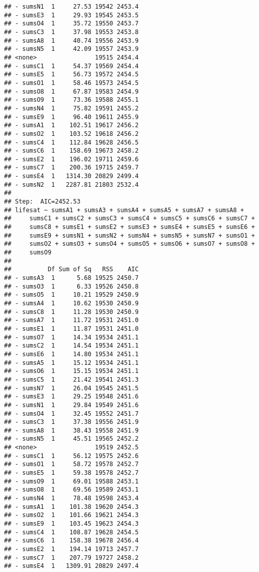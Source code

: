 \documentclass[,man,floatsintext]{apa6}
\begin{document}
\begin{verbatim}
## - sumsN1  1     27.53 19542 2453.4
## - sumsE3  1     29.93 19545 2453.5
## - sumsO4  1     35.72 19550 2453.7
## - sumsC3  1     37.98 19553 2453.8
## - sumsA8  1     40.74 19556 2453.9
## - sumsN5  1     42.09 19557 2453.9
## <none>                19515 2454.4
## - sumsC1  1     54.37 19569 2454.4
## - sumsE5  1     56.73 19572 2454.5
## - sumsO1  1     58.46 19573 2454.5
## - sumsO8  1     67.87 19583 2454.9
## - sumsO9  1     73.36 19588 2455.1
## - sumsN4  1     75.82 19591 2455.2
## - sumsE9  1     96.40 19611 2455.9
## - sumsA1  1    102.51 19617 2456.2
## - sumsO2  1    103.52 19618 2456.2
## - sumsC4  1    112.84 19628 2456.5
## - sumsC6  1    158.69 19673 2458.2
## - sumsE2  1    196.02 19711 2459.6
## - sumsC7  1    200.36 19715 2459.7
## - sumsE4  1   1314.30 20829 2499.4
## - sumsN2  1   2287.81 21803 2532.4
## 
## Step:  AIC=2452.53
## lifesat ~ sumsA1 + sumsA3 + sumsA4 + sumsA5 + sumsA7 + sumsA8 + 
##     sumsC1 + sumsC2 + sumsC3 + sumsC4 + sumsC5 + sumsC6 + sumsC7 + 
##     sumsC8 + sumsE1 + sumsE2 + sumsE3 + sumsE4 + sumsE5 + sumsE6 + 
##     sumsE9 + sumsN1 + sumsN2 + sumsN4 + sumsN5 + sumsN7 + sumsO1 + 
##     sumsO2 + sumsO3 + sumsO4 + sumsO5 + sumsO6 + sumsO7 + sumsO8 + 
##     sumsO9
## 
##          Df Sum of Sq   RSS    AIC
## - sumsA3  1      5.68 19525 2450.7
## - sumsO3  1      6.33 19526 2450.8
## - sumsO5  1     10.21 19529 2450.9
## - sumsA4  1     10.62 19530 2450.9
## - sumsC8  1     11.28 19530 2450.9
## - sumsA7  1     11.72 19531 2451.0
## - sumsE1  1     11.87 19531 2451.0
## - sumsO7  1     14.34 19534 2451.1
## - sumsC2  1     14.54 19534 2451.1
## - sumsE6  1     14.80 19534 2451.1
## - sumsA5  1     15.12 19534 2451.1
## - sumsO6  1     15.15 19534 2451.1
## - sumsC5  1     21.42 19541 2451.3
## - sumsN7  1     26.04 19545 2451.5
## - sumsE3  1     29.25 19548 2451.6
## - sumsN1  1     29.84 19549 2451.6
## - sumsO4  1     32.45 19552 2451.7
## - sumsC3  1     37.38 19556 2451.9
## - sumsA8  1     38.43 19558 2451.9
## - sumsN5  1     45.51 19565 2452.2
## <none>                19519 2452.5
## - sumsC1  1     56.12 19575 2452.6
## - sumsO1  1     58.72 19578 2452.7
## - sumsE5  1     59.38 19578 2452.7
## - sumsO9  1     69.01 19588 2453.1
## - sumsO8  1     69.56 19589 2453.1
## - sumsN4  1     78.48 19598 2453.4
## - sumsA1  1    101.38 19620 2454.3
## - sumsO2  1    101.66 19621 2454.3
## - sumsE9  1    103.45 19623 2454.3
## - sumsC4  1    108.87 19628 2454.5
## - sumsC6  1    158.38 19678 2456.4
## - sumsE2  1    194.14 19713 2457.7
## - sumsC7  1    207.79 19727 2458.2
## - sumsE4  1   1309.91 20829 2497.4

\end{verbatim}
\end{document}
